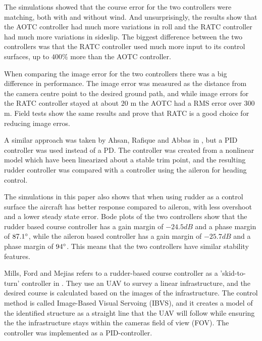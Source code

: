 The simulations showed that the course error for the two controllers were matching, both with and without wind. And unsurprisingly, the results show that the AOTC controller had much more variations in roll and the RATC controller had much more variations in sideslip. The biggest difference between the two controllers was that the RATC controller used much more input to its control surfaces, up to $400 \%$ more than the AOTC controller.

When comparing the image error for the two controllers there was a big difference in performance. The image error was measured as the distance from the camera centre point to the desired ground path, and while image errors for the RATC controller stayed at about $20$ m the AOTC had a RMS error over $300$ m. Field tests show the same results and prove that RATC is a good choice for reducing image erros.


A similar approach was taken by Ahsan, Rafique and Abbas in \cite{alternateSurfaceAhsan}, but a PID controller was used instead of a PD. The controller was created from a nonlinear model which have been linearized about a stable trim point, and the resulting rudder controller was compared with a controller using the aileron for heading control.

The simulations in this paper also shows that when using rudder as a control surface the aircraft has better response compared to aileron, with less overshoot and a lower steady state error. Bode plots of the two controllers show that the rudder based course controller has a gain margin of $-24.5 dB$ and a phase margin of $87.1 \degree$, while the aileron based controller has a gain margin of $-25.7 dB$ and a phase margin of $94 \degree$. This means that the two controllers have similar stability features.

Mills, Ford and Mejias refers to a rudder-based course controller as a 'skid-to-turn' controller in \cite{skidToTurnMills}. They use an UAV to survey a linear infrastructure, and the desired course is calculated based on the images of the infrastructure. The control method is called Image-Based Visual Servoing (IBVS), and it creates a model of the identified structure as a straight line that the UAV will follow while ensuring the the infrastructure stays within the cameras field of view (FOV). The controller was implemented as a PID-controller.

